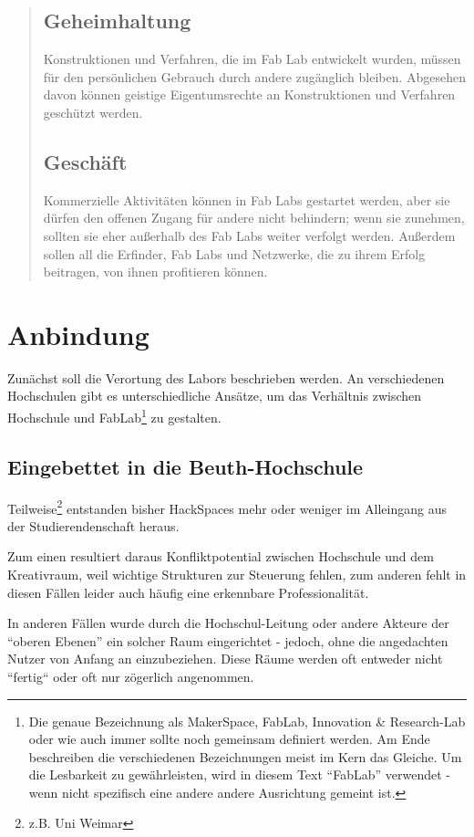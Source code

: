 \documentclass[parskip=half,headsepline,footsepline,titlepage]{scrartcl}
\begin{document}
\begin{quote}
\subsection*{Geheimhaltung}

Konstruktionen und Verfahren, die im Fab Lab entwickelt wurden, müssen für den persönlichen Gebrauch durch andere zugänglich bleiben. Abgesehen davon können geistige Eigentumsrechte an Konstruktionen und Verfahren geschützt werden.

\subsection*{Geschäft}

Kommerzielle Aktivitäten können in Fab Labs gestartet werden, aber sie dürfen den offenen Zugang für andere nicht behindern; wenn sie zunehmen, sollten sie eher außerhalb des Fab Labs weiter verfolgt werden. Außerdem sollen all die Erfinder, Fab Labs und Netzwerke, die zu ihrem Erfolg beitragen, von ihnen profitieren können.
\end{quote}

\section{Anbindung}
Zunächst soll die Verortung des Labors beschrieben werden. An verschiedenen Hochschulen gibt es unterschiedliche Ansätze, um das Verhältnis zwischen Hochschule und FabLab\footnote{Die genaue Bezeichnung als MakerSpace, FabLab, Innovation \& Research-Lab oder wie auch immer sollte noch gemeinsam definiert werden. Am Ende beschreiben die verschiedenen Bezeichnungen meist im Kern das Gleiche. Um die Lesbarkeit zu gewährleisten, wird in diesem Text ``FabLab'' verwendet - wenn nicht spezifisch eine andere andere Ausrichtung gemeint ist.} zu gestalten.

\subsection{Eingebettet in die Beuth-Hochschule}
Teilweise\footnote{z.B. Uni Weimar} entstanden bisher HackSpaces mehr oder weniger im Alleingang aus der Studierendenschaft heraus. 

Zum einen resultiert daraus Konfliktpotential zwischen Hochschule und dem Kreativraum, weil wichtige Strukturen zur Steuerung fehlen, zum anderen fehlt in diesen Fällen leider auch häufig eine erkennbare Professionalität.

In anderen Fällen wurde durch die Hochschul-Leitung oder andere Akteure der ``oberen Ebenen'' ein solcher Raum eingerichtet - jedoch, ohne die angedachten Nutzer von Anfang an einzubeziehen. Diese Räume werden oft entweder nicht ``fertig`` oder oft nur zögerlich angenommen.
\end{document}

